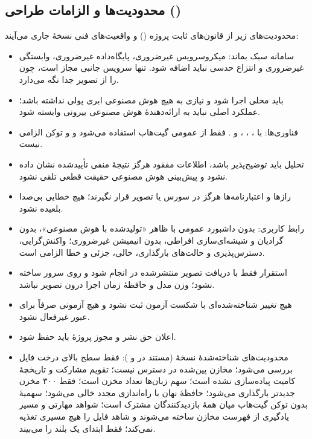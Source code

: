 \documentclass[12pt]{article}
\newcommand{\code}[1]{\lr{\texttt{#1}}}
\begin{document}
\subsection{محدودیت‌ها و الزامات طراحی ()}
 محدودیت‌های زیر از قانون‌های ثابت پروژه (\code{TODO.md}) و واقعیت‌های فنی نسخهٔ جاری می‌آیند:

\begin{itemize}
\item سامانه سبک بماند: میکروسرویس غیرضروری، پایگاه‌داده غیرضروری، وابستگی غیرضروری و انتزاع حدسی نباید اضافه شود. تنها سرویس جانبی مجاز  است، چون  را از تصویر  جدا نگه می‌دارد.
\item {} باید محلی اجرا شود و نیازی به هیچ  هوش مصنوعی ابری پولی نداشته باشد؛ عملکرد اصلی نباید به ارائه‌دهندهٔ هوش مصنوعی بیرونی وابسته شود.
\item فناوری‌ها:  با ، ، ،  و . فقط از  عمومی گیت‌هاب استفاده می‌شود و  و توکن الزامی نیست.
\item تحلیل باید توضیح‌پذیر باشد، اطلاعات مفقود هرگز نتیجهٔ منفی تأییدشده نشان داده نشود و پیش‌بینی هوش مصنوعی حقیقت قطعی تلقی نشود.
\item رازها و اعتبارنامه‌ها هرگز در سورس یا تصویر قرار نگیرند؛ هیچ خطایی بی‌صدا بلعیده نشود.
\item رابط کاربری: بدون داشبورد عمومی با ظاهر «تولیدشده با هوش مصنوعی»، بدون گرادیان و شیشه‌ای‌سازی افراطی، بدون انیمیشن غیرضروری؛ واکنش‌گرایی، دسترس‌پذیری و حالت‌های بارگذاری، خالی، جزئی و خطا الزامی است.
\item استقرار فقط با دریافت تصویر منتشرشده در  انجام شود و روی سرور ساخته نشود؛ وزن مدل و حافظهٔ زمان اجرا درون تصویر نباشد.
\item هیچ تغییر شناخته‌شده‌ای با شکست آزمون ثبت نشود و هیچ آزمونی صرفاً برای عبور  غیرفعال نشود.
\item اعلان حق نشر و مجوز  پروژهٔ  باید حفظ شود.
\item محدودیت‌های شناخته‌شدهٔ نسخهٔ  (مستند در \code{README.md} و \code{PLAN.md}): فقط سطح بالای درخت فایل بررسی می‌شود؛ مخازن پین‌شده در دسترس نیست؛ تقویم مشارکت و تاریخچهٔ کامیت پیاده‌سازی نشده است؛ سهم زبان‌ها تعداد مخزن است؛ فقط ۳۰۰ مخزن جدیدتر بارگذاری می‌شود؛ حافظهٔ نهان با راه‌اندازی مجدد خالی می‌شود؛ سهمیهٔ بدون توکن گیت‌هاب میان همهٔ بازدیدکنندگان مشترک است؛ شواهد مهارتی و مسیر یادگیری از فهرست مخازن ساخته می‌شوند و شاهد فایل را هیچ مسیری تغذیه نمی‌کند؛  فقط ابتدای یک  بلند را می‌بیند.
\end{itemize}
\end{document}
